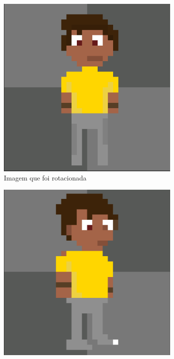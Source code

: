 \begin{figure}[htbp]
    \centering
    \caption{\small Processo da utilização 3 da ferramenta de rotação do PixelLab em julho/2025}
    \label{fig:pixelLabRotacao4}

    \begin{subfigure}{0.32\linewidth}
        \includegraphics[width=1\linewidth]{figs/pixelLab/dia2/sprite_centro.PNG}
        \caption{\small Imagem que foi rotacionada}
        \label{fig:pixelLabRot4a}
    \end{subfigure}
    \begin{subfigure}{0.32\linewidth}
        \includegraphics[width=1\linewidth]{figs/pixelLab/dia2/rot45res4.PNG}

\end{subfigure}
\end{figure}
